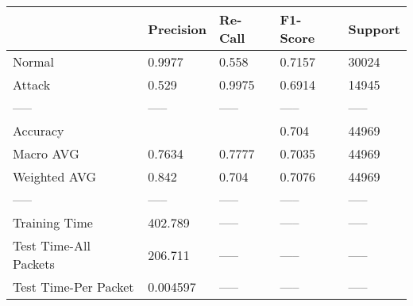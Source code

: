 \begin{tabular}{lllll}
\toprule
{} & Precision & Re-Call & F1-Score & Support \\
\midrule
Normal                &    0.9977 &   0.558 &   0.7157 &   30024 \\
Attack                &     0.529 &  0.9975 &   0.6914 &   14945 \\
-----                 &     ----- &   ----- &    ----- &   ----- \\
Accuracy              &           &         &    0.704 &   44969 \\
Macro AVG             &    0.7634 &  0.7777 &   0.7035 &   44969 \\
Weighted AVG          &     0.842 &   0.704 &   0.7076 &   44969 \\
-----                 &     ----- &   ----- &    ----- &   ----- \\
Training Time         &   402.789 &   ----- &    ----- &   ----- \\
Test Time-All Packets &   206.711 &   ----- &    ----- &   ----- \\
Test Time-Per Packet  &  0.004597 &   ----- &    ----- &   ----- \\
\bottomrule
\end{tabular}
